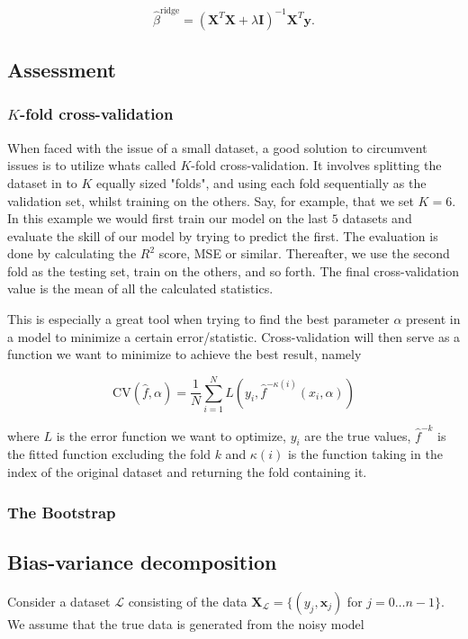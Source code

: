 \begin{equation}
  \hat \beta^{\text{ridge}} = (\mathbf X^T\mathbf X + \lambda \mathbf I)^{-1}\mathbf X^T\mathbf y.
\end{equation}

\subsection{Assessment}
\subsubsection{$K$-fold cross-validation}
When faced with the issue of a small dataset, a good solution to circumvent issues is to utilize whats called $K$-fold cross-validation. It involves splitting the dataset in to $K$ equally sized "folds", and using each fold sequentially as the validation set, whilst training on the others. Say, for example, that we set $K=6$. In this example we would first train our model on the last $5$ datasets and evaluate the skill of our model by trying to predict the first. The evaluation is done by calculating the $R^2$ score, MSE or similar. Thereafter, we use the second fold as the testing set, train on the others, and so forth. The final cross-validation value is the mean of all the calculated statistics.

This is especially a great tool when trying to find the best parameter $\alpha$ present in a model to minimize a certain error/statistic. Cross-validation will then serve as a function we want to minimize to achieve the best result, namely

\begin{equation}
  \text{CV}(\hat f, \alpha) = \frac{1}{N}\sum_{i=1}^N L\left(y_i, \hat f^{-\kappa(i)}(x_i, \alpha)\right)
\end{equation}

where $L$ is the error function we want to optimize, $y_i$ are the true values, $\hat f^{-k}$ is the fitted function excluding the fold $k$ and $\kappa(i)$ is the function taking in the index of the original dataset and returning the fold containing it. 

\subsubsection{The Bootstrap}


\subsection{Bias-variance decomposition}\label{sec:bv_decomp}
Consider a dataset \ensuremath{\mathcal{L}} consisting of the data \ensuremath{\mathbf{X}_\mathcal{L}=\{(y_j, \boldsymbol{x}_j)} for \ensuremath{j=0\ldots n-1\}}. We assume that the true data is generated from the noisy model

